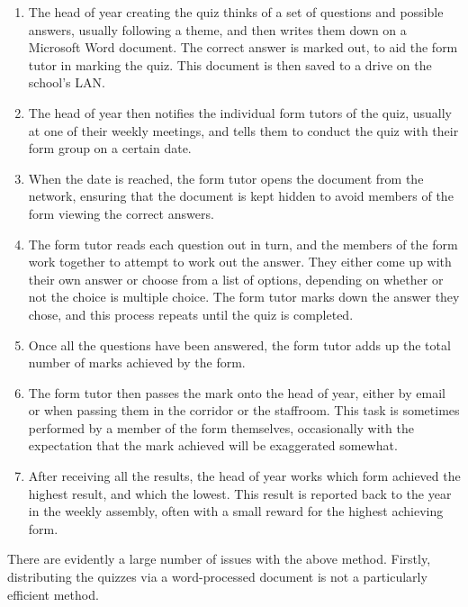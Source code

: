 \begin{enumerate}
\item The head of year creating the quiz thinks of a set of questions and possible answers, usually following a theme, and then writes them down on a Microsoft Word document. The correct answer is marked out, to aid the form tutor in marking the quiz. This document is then saved to a drive on the school's LAN.

\item The head of year then notifies the individual form tutors of the quiz, usually at one of their weekly meetings, and tells them to conduct the quiz with their form group on a certain date.

\item When the date is reached, the form tutor opens the document from the network, ensuring that the document is kept hidden to avoid members of the form viewing the correct answers.

\item The form tutor reads each question out in turn, and the members of the form work together to attempt to work out the answer. They either come up with their own answer or choose from a list of options, depending on whether or not the choice is multiple choice. The form tutor marks down the answer they chose, and this process repeats until the quiz is completed.

\item Once all the questions have been answered, the form tutor adds up the total number of marks achieved by the form.

\item The form tutor then passes the mark onto the head of year, either by email or when passing them in the corridor or the staffroom. This task is sometimes performed by a member of the form themselves, occasionally with the expectation that the mark achieved will be exaggerated somewhat.

\item After receiving all the results, the head of year works which form achieved the highest result, and which the lowest. This result is reported back to the year in the weekly assembly, often with a small reward for the highest achieving form.
\end{enumerate}

There are evidently a large number of issues with the above method. Firstly, distributing the quizzes via a word-processed document is not a particularly efficient method. 

